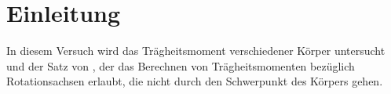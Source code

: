 
\section{Einleitung}

In diesem Versuch wird das Trägheitsmoment verschiedener Körper
untersucht und der Satz von , der das Berechnen von
Trägheitsmomenten bezüglich Rotationsachsen erlaubt, die nicht durch den
Schwerpunkt des Körpers gehen.
